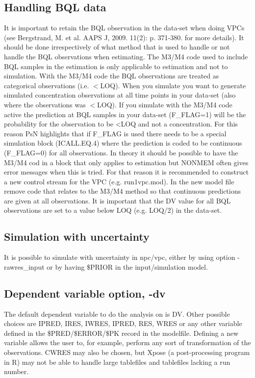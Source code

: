 \subsection{Handling BQL data}
It is important to retain the BQL observation in the data-set when doing VPCs (see Bergstrand, M. et al. AAPS J, 2009. 11(2): p. 371-380. for more details). It should be done irrespectively of what method that is used to handle or not handle the BQL observations when estimating. The M3/M4 code used to include BQL samples in the estimation is only applicable to estimation and not to simulation. With the M3/M4 code the BQL observations are treated as categorical observations (i.e. $<$LOQ). When you simulate you want to generate simulated concentration observations at all time points in your data-set (also where the observations was $<$LOQ). If you simulate with the M3/M4 code active the prediction at BQL samples in your data-set (F\_FLAG=1) will be the probability for the observation to be <LOQ and not a concentration. For this reason PsN highlights that if F\_FLAG is used there needs to be a special simulation block (ICALL.EQ.4) where the prediction is coded to be continuous (F\_FLAG=0) for all observations. In theory it should be possible to have the M3/M4 cod in a block that only applies to estimation but NONMEM often gives error messages when this is tried. For that reason it is recommended to construct a new control stream for the VPC (e.g. run1vpc.mod). In the new model file remove code that relates to the M3/M4 method so that continuous predictions are given at all observations. It is important that the DV value for all BQL observations are set to a value below LOQ (e.g. LOQ/2) in the data-set. 

\subsection{Simulation with uncertainty}
It is possible to simulate with uncertainty in npc/vpc, either by using option -rawres\_input or by having \$PRIOR in the input/simulation model.

\subsection{Dependent variable option, -dv}
The default dependent variable to do the analysis on is DV. Other possible choices are IPRED, IRES, IWRES, IPRED, RES, WRES or any other variable defined in the \$PRED/\$ERROR/\$PK record in the modelfile. Defining a new variable allows the user to, for example, perform any sort of transformation of the observations. CWRES may also be chosen, but Xpose (a post-processing program in R) may not be able to handle large tablefiles and tablefiles lacking a run number. 

